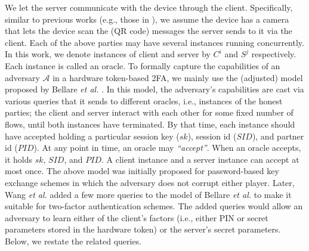 We let the server communicate with the device through the client. Specifically, similar to previous works (e.g., those in \cite{JareckiJKSS21,Digipass-website,Gemalto}), we assume the device has a camera that lets the device scan the (QR code) messages the server sends to it via the client. Each of the above parties may have several instances running concurrently. In this work, we denote instances of client and server by  $C^{i}$ and  $S^{j}$ respectively. Each instance is called an oracle.  
%
To formally capture the capabilities of an adversary $\mathcal{A}$ in a hardware token-based 2FA,  we mainly use the (adjusted) model proposed by Bellare \textit{et al.} \cite{BellarePR00}. In this model, the adversary’s capabilities are cast via various queries that it sends to different oracles, i.e., instances of the honest parties; the client and server interact with each other for some fixed number of flows, until both instances have terminated. By that time, each instance should have accepted holding a particular session key ($sk$), session id ($SID$), and partner id ($PID$). At any point in time, an oracle may \emph{``accept''}. When an oracle accepts, it holds $sk$, $SID$, and $PID$. A client instance and a server instance can accept at most once. The above model was initially proposed for password-based key exchange schemes in which the adversary does not corrupt either player.  Later, Wang \textit{et al.} \cite{WangW18}  added a few more queries to the model of  Bellare \textit{et al.} to make it suitable for two-factor authentication schemes. The added queries would allow an adversary to learn either of the client's factors (i.e., either PIN or secret parameters stored in the hardware token) or the server's secret parameters.  Below, we restate the related queries. 
 





